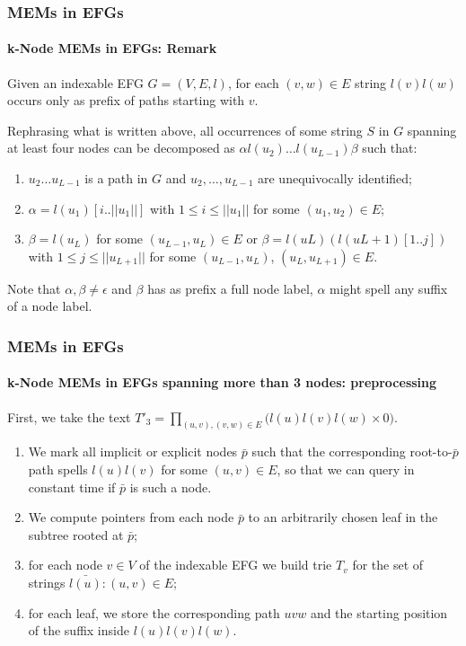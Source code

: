 \begin{frame}
	\frametitle{MEMs in EFGs}
	\framesubtitle{k-Node MEMs in EFGs: Remark}
	\begin{remark}
		Given an indexable EFG \(G = (V, E, l)\), for each \((v, w) \in E\)
		string \(l(v)l(w)\) occurs only as prefix of paths starting with \(v\).
	\end{remark}
	Rephrasing what is written above, all occurrences of some string \(S\) in \(G\) spanning at
	least four nodes can be decomposed as \(\alpha l(u_2 ) \dots l(u_{L-1})\beta\) such that:
	\begin{enumerate}
		\item \(u_2 \dots u_{L-1}\) is a path in \(G\) and \(u_2, \dots , u_{L-1}\)
		are unequivocally identified;
		\item \(\alpha = l(u_1)[i..||u_1||]\) with \(1 \leq i \leq ||u_1||\) for some \((u_1, u_2 ) \in E\);
		\item \(\beta = l(u_L)\) for some \((u_{L-1} , u_L ) \in E\)
		or \(\beta = l(uL )(l(uL+1 )[1..j])\) with \(1 \leq j \leq ||u_{L+1}||\)
		for some \((u_{L-1} , u_L )\), \((u_L , u_{L+1} ) \in E\).
	\end{enumerate}
	Note that \(\alpha, \beta \neq \epsilon\) and \(\beta\) has as prefix a full node label,
	\(\alpha\) might spell any suffix of a node label.
\end{frame}

\begin{frame}
	\frametitle{MEMs in EFGs}
	\framesubtitle{k-Node MEMs in EFGs spanning more than 3 nodes: preprocessing}
	First, we take the text
	\(
		T'_3 = \prod_{(u, v), (v, w) \in E} \bigl(l(u)l(v)l(w) \times 0\bigr).
	\)
	\begin{enumerate}
		\item {} We mark all implicit or explicit nodes \(\bar{p}\) such that the
		corresponding root-to-\(\bar{p}\) path spells
		\(l(u)l(v)\) for some \((u, v) \in E\), so that we can query in constant time if $\bar{p}$
		is such a node.
		\item {} We compute pointers from each node $\bar{p}$ to an arbitrarily chosen
		leaf in the subtree rooted at $\bar{p}$;
		\item {}for each node \(v \in V\) of the indexable EFG we build trie $T_v$ for the
		set of strings ${\bar{l(u)}: (u, v) \in E}$;
		\item {} for each leaf, we store the corresponding path \(uvw\) and the starting
		position of the suffix inside \(l(u)l(v)l(w)\).
	\end{enumerate}
\end{frame}


